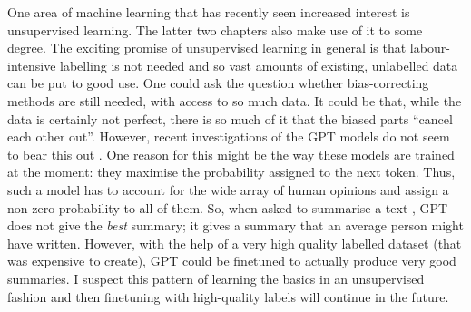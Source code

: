 One area of machine learning that has recently seen increased interest is unsupervised learning.
The latter two chapters also make use of it to some degree.
The exciting promise of unsupervised learning in general is
that labour-intensive labelling is not needed and so vast amounts of existing, unlabelled data can be put to good use.
One could ask the question whether bias-correcting methods are still needed, with access to so much data.
It could be that, while the data is certainly not perfect,
there is so much of it that the biased parts ``cancel each other out''.
However, recent investigations of the GPT models \citep{radford2018improving,radford2019language,brown2020language} do not seem to bear this out \citep{khalifa2021distributional}.
One reason for this might be the way these models are trained at the moment:
they maximise the probability assigned to the next token.
Thus, such a model has to account for the wide array of human opinions and assign a non-zero probability to all of them.
So, when asked to summarise a text \citep{stiennon2020learning}, GPT does not give the \emph{best} summary;
it gives a summary that an average person might have written.
However, with the help of a very high quality labelled dataset (that was expensive to create),
GPT could be finetuned to actually produce very good summaries.
I suspect this pattern of learning the basics in an unsupervised fashion
and then finetuning with high-quality labels will continue in the future.
